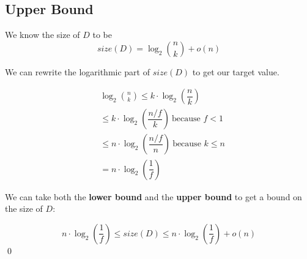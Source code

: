 \documentclass{article}
\begin{document}

\subsection*{Upper Bound}
We know the size of \(D\) to be
\[size(D) = \log_2 \binom{n}{k} + o(n)\]

We can rewrite the logarithmic part of \(size(D)\) to get our target value.

\[
\begin{aligned}
	& \log_2 \binom{n}{k} \leq k \cdot \log_2 \left( \dfrac{n}{k} \right) \\
	&\leq k \cdot \log_2 \left( \dfrac{n/f}{k} \right) \ \text{because \(f < 1\)} \\
	&\leq n \cdot \log_2 \left( \dfrac{n/f}{n} \right) \ \text{because \(k \leq n\)} \\
	&= n \cdot \log_2 \left( \dfrac{1}{f} \right)
\end{aligned}
\]


We can take both the \textbf{lower bound} and the \textbf{upper bound} to get a
bound on the size of \(D\):

\[
	n \cdot \log_2 \left( \dfrac{1}{f} \right) \leq
	size(D) \leq n \cdot \log_2 \left( \dfrac{1}{f} \right) + o(n)
\]
\qed
\end{document}
